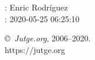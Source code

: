 \documentclass[11pt]{article}
\begin{document}
    \newcommand{\SampleTwoCol}{\SampleTwoColInputOutput{sample}{}}
    \newcommand{\SampleOneCol}{\SampleOneColInputOutput{sample}{}}

    \ProblemInformation
    \Author: Enric Rodríguez\\    
    \Generation: 2020-05-25 06:25:10

    \bigskip

    \copyright\ \emph{Jutge.org}, 2006--2020. \\
    https:$/\!\!/$jutge.org
\end{document}
